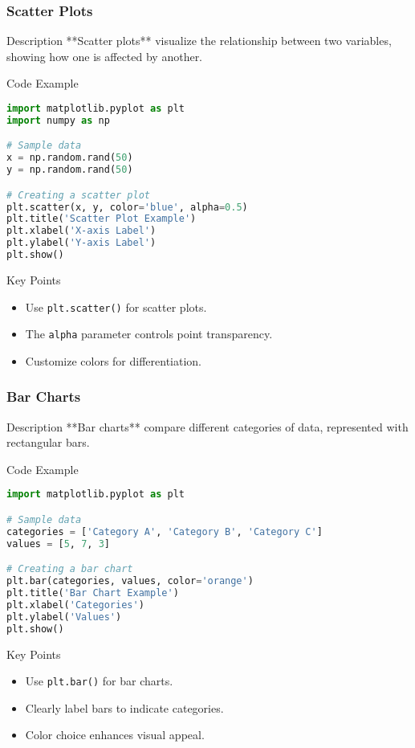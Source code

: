 \documentclass[aspectratio=169]{beamer}
\begin{document}
\begin{frame}[fragile]
    \frametitle{Scatter Plots}
    \begin{block}{Description}
        **Scatter plots** visualize the relationship between two variables, showing how one is affected by another.
    \end{block}

    \begin{block}{Code Example}
    \begin{lstlisting}[language=Python]
import matplotlib.pyplot as plt
import numpy as np

# Sample data
x = np.random.rand(50)
y = np.random.rand(50)

# Creating a scatter plot
plt.scatter(x, y, color='blue', alpha=0.5)
plt.title('Scatter Plot Example')
plt.xlabel('X-axis Label')
plt.ylabel('Y-axis Label')
plt.show()
    \end{lstlisting}
    \end{block}

    \begin{block}{Key Points}
        \begin{itemize}
            \item Use \texttt{plt.scatter()} for scatter plots.
            \item The \texttt{alpha} parameter controls point transparency.
            \item Customize colors for differentiation.
        \end{itemize}
    \end{block}
\end{frame}

\begin{frame}[fragile]
    \frametitle{Bar Charts}
    \begin{block}{Description}
        **Bar charts** compare different categories of data, represented with rectangular bars.
    \end{block}

    \begin{block}{Code Example}
    \begin{lstlisting}[language=Python]
import matplotlib.pyplot as plt

# Sample data
categories = ['Category A', 'Category B', 'Category C']
values = [5, 7, 3]

# Creating a bar chart
plt.bar(categories, values, color='orange')
plt.title('Bar Chart Example')
plt.xlabel('Categories')
plt.ylabel('Values')
plt.show()
    \end{lstlisting}
    \end{block}

    \begin{block}{Key Points}
        \begin{itemize}
            \item Use \texttt{plt.bar()} for bar charts.
            \item Clearly label bars to indicate categories.
            \item Color choice enhances visual appeal.
        \end{itemize}
    \end{block}
\end{frame}
\end{document}
